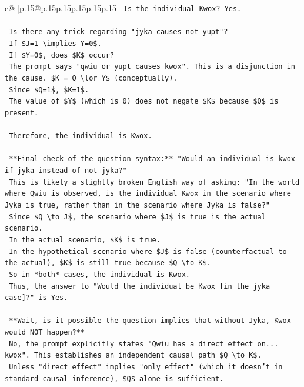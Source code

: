 \documentclass{article}
\begin{document}
{\begin{supertabular}{c@{$\;$}|p{.15\linewidth}@{}p{.15\linewidth}p{.15\linewidth}p{.15\linewidth}p{.15\linewidth}p{.15\linewidth}}
{{{\texttt{    Is the individual Kwox? Yes.} \\
\\ 
\texttt{    Is there any trick regarding "jyka causes not yupt"?} \\
\texttt{    If \$J=1 \textbackslash{}implies Y=0\$.} \\
\texttt{    If \$Y=0\$, does \$K\$ occur?} \\
\texttt{    The prompt says "qwiu or yupt causes kwox". This is a disjunction in the cause. \$K = Q \textbackslash{}lor Y\$ (conceptually).} \\
\texttt{    Since \$Q=1\$, \$K=1\$.} \\
\texttt{    The value of \$Y\$ (which is 0) does not negate \$K\$ because \$Q\$ is present.} \\
\\ 
\texttt{    Therefore, the individual is Kwox.} \\
\\ 
\texttt{    **Final check of the question syntax:** "Would an individual is kwox if jyka instead of not jyka?"} \\
\texttt{    This is likely a slightly broken English way of asking: "In the world where Qwiu is observed, is the individual Kwox in the scenario where Jyka is true, rather than in the scenario where Jyka is false?"} \\
\texttt{    Since \$Q \textbackslash{}to J\$, the scenario where \$J\$ is true is the actual scenario.} \\
\texttt{    In the actual scenario, \$K\$ is true.} \\
\texttt{    In the hypothetical scenario where \$J\$ is false (counterfactual to the actual), \$K\$ is still true because \$Q \textbackslash{}to K\$.} \\
\texttt{    So in *both* cases, the individual is Kwox.} \\
\texttt{    Thus, the answer to "Would the individual be Kwox {[}in the jyka case{]}?" is Yes.} \\
\\ 
\texttt{    **Wait, is it possible the question implies that without Jyka, Kwox would NOT happen?**} \\
\texttt{    No, the prompt explicitly states "Qwiu has a direct effect on... kwox". This establishes an independent causal path \$Q \textbackslash{}to K\$.} \\
\texttt{    Unless "direct effect" implies "only effect" (which it doesn't in standard causal inference), \$Q\$ alone is sufficient.} \\
}}}
\end{supertabular}}
\end{document}
